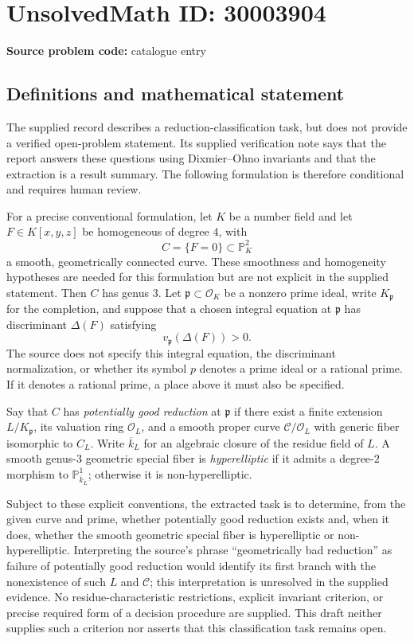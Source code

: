 \documentclass[11pt]{article}
\newcommand{\PP}{\mathbb{P}}
\begin{document}
\section*{UnsolvedMath ID: 30003904}
\textbf{Source problem code:} catalogue entry
\subsection{Definitions and mathematical statement}
The supplied record describes a reduction-classification task, but does not provide a verified open-problem statement. Its supplied verification note says that the report answers these questions using Dixmier--Ohno invariants and that the extraction is a result summary. The following formulation is therefore conditional and requires human review.

For a precise conventional formulation, let \(K\) be a number field and let \(F\in K[x,y,z]\) be homogeneous of degree \(4\), with
\[
C=\{F=0\}\subset\PP^2_K
\]
a smooth, geometrically connected curve. These smoothness and homogeneity hypotheses are needed for this formulation but are not explicit in the supplied statement. Then \(C\) has genus \(3\). Let \(\mathfrak p\subset\mathcal O_K\) be a nonzero prime ideal, write \(K_{\mathfrak p}\) for the completion, and suppose that a chosen integral equation at \(\mathfrak p\) has discriminant \(\Delta(F)\) satisfying
\[
v_{\mathfrak p}(\Delta(F))>0.
\]
The source does not specify this integral equation, the discriminant normalization, or whether its symbol \(p\) denotes a prime ideal or a rational prime. If it denotes a rational prime, a place above it must also be specified.

Say that \(C\) has \emph{potentially good reduction} at \(\mathfrak p\) if there exist a finite extension \(L/K_{\mathfrak p}\), its valuation ring \(\mathcal O_L\), and a smooth proper curve \(\mathcal C/\mathcal O_L\) with generic fiber isomorphic to \(C_L\). Write \(\overline{k}_L\) for an algebraic closure of the residue field of \(L\). A smooth genus-\(3\) geometric special fiber is \emph{hyperelliptic} if it admits a degree-\(2\) morphism to \(\PP^1_{\overline{k}_L}\); otherwise it is non-hyperelliptic.

Subject to these explicit conventions, the extracted task is to determine, from the given curve and prime, whether potentially good reduction exists and, when it does, whether the smooth geometric special fiber is hyperelliptic or non-hyperelliptic. Interpreting the source's phrase ``geometrically bad reduction'' as failure of potentially good reduction would identify its first branch with the nonexistence of such \(L\) and \(\mathcal C\); this interpretation is unresolved in the supplied evidence. No residue-characteristic restrictions, explicit invariant criterion, or precise required form of a decision procedure are supplied. This draft neither supplies such a criterion nor asserts that this classification task remains open.
\end{document}
